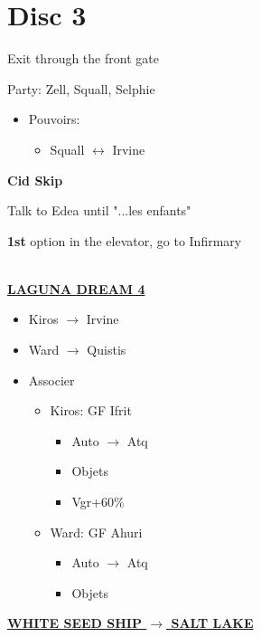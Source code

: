 \chapter{Disc 3}

Exit through the front gate

Party: Zell, Squall, Selphie
\begin{itemize}
	\item Pouvoirs:
		\begin{itemize}
			\item Squall $\leftrightarrow$ Irvine
		\end{itemize}
\end{itemize}

\textbf{Cid Skip}

Talk to Edea until "...les enfants"

\textbf{1st} option in the elevator, go to Infirmary

\leavevmode\\
\underline{\textbf{LAGUNA DREAM 4}}

\begin{itemize}
	\item Kiros $\rightarrow$ Irvine
	\item Ward $\rightarrow$ Quistis
\end{itemize}

\begin{menu}
	\begin{itemize}
		\item Associer
			\begin{itemize}
				\item Kiros: GF Ifrit
					\begin{itemize}
						\item Auto $\rightarrow$ Atq
						\item Objets
						\item Vgr+60\%
					\end{itemize}
				\item Ward: GF Ahuri
					\begin{itemize}
						\item Auto $\rightarrow$ Atq
						\item Objets
					\end{itemize}
			\end{itemize}
	\end{itemize}
\end{menu}

\underline{\textbf{WHITE SEED SHIP $\rightarrow$ SALT LAKE}}

